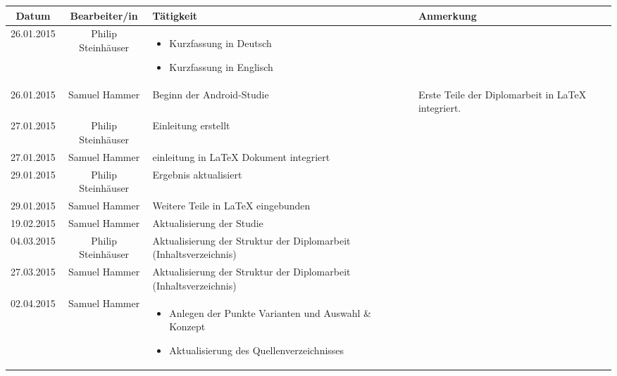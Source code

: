 \begin{table}
	\centering
	\begin{tabular}{| c | c | p{6cm} | p{4cm} |}
		\hline
		\textbf{Datum} & \textbf{Bearbeiter/in} & \textbf{Tätigkeit} & \textbf{Anmerkung}
		\\\hline %
		26.01.2015 
		&%
		Philip Steinhäuser
		&%
		\begin{itemize}
			\item Kurzfassung in Deutsch
			\item Kurzfassung in Englisch
		\end{itemize}
		&%
		\\\hline %
		26.01.2015
		&%
		Samuel Hammer
		&%
		Beginn der Android-Studie
		&%
		Erste Teile der Diplomarbeit in LaTeX integriert.
		\\\hline %
		27.01.2015
		&%
		Philip Steinhäuser
		&%
		Einleitung erstellt
		&%
		\\\hline %
		27.01.2015
		&%
		Samuel Hammer
		&%
		einleitung in LaTeX Dokument integriert
		&%
		\\\hline %
		29.01.2015
		&%
		Philip Steinhäuser
		&%
		Ergebnis aktualisiert
		&%
		\\\hline %
		29.01.2015
		&%
		Samuel Hammer
		&%
		Weitere Teile in LaTeX eingebunden
		&%
		\\\hline %
		19.02.2015
		&%
		Samuel Hammer
		&%
		Aktualisierung der Studie
		&%
		\\\hline %
		04.03.2015
		&%
		Philip Steinhäuser
		&%
		Aktualisierung der Struktur der Diplomarbeit (Inhaltsverzeichnis)
		&%
		\\\hline %
		27.03.2015
		&%
		Samuel Hammer
		&%
		Aktualisierung der Struktur der Diplomarbeit (Inhaltsverzeichnis)
		&%
		\\\hline %
		02.04.2015
		&%
		Samuel Hammer
		&%
		\begin{itemize}
			\item Anlegen der Punkte Varianten und Auswahl \& Konzept
			\item Aktualisierung des Quellenverzeichnisses
		\end{itemize}
		&%
		\\\hline %

\end{tabular}
\end{table}
